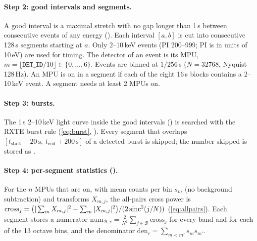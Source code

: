 \paragraph{Step 2: good intervals and segments.} A good interval is a maximal stretch with no gap longer than 1\,s between
consecutive events of any energy (). Each interval $[a,b]$ is cut into consecutive 128\,s
segments starting at $a$. Only 2--10\,keV events (PI 200--999; PI is in units of 10\,eV) are used for timing. The detector
of an event is its MPU, $m=\lfloor\mathtt{DET\_ID}/10\rfloor\in\{0,\dots,6\}$. Events are binned at $1/256$\,s ($N=32768$,
Nyquist 128\,Hz). An MPU is on in a segment if each of the eight 16\,s blocks contains a 2--10\,keV event. A segment needs at
least 2 MPUs on.

\paragraph{Step 3: bursts.} The 1\,s 2--10\,keV light curve inside the good intervals () is searched with
the RXTE burst rule (\cref{eq:burst}, ). Every segment that overlaps
$[t_\mathrm{start}-20\,\mathrm{s},\ t_\mathrm{end}+200\,\mathrm{s}]$ of a detected burst is skipped; the number skipped is
stored as .

\paragraph{Step 4: per-segment statistics ().} For the $n$ MPUs that are on, with mean counts per
bin $s_m$ (no background subtraction) and transforms $X_{m,j}$, the all-pairs cross power is
$\mathrm{cross}_j=\bigl(|\sum_mX_{m,j}|^2-\sum_m|X_{m,j}|^2\bigr)/(2\operatorname{sinc}^2(j/N))$ (\cref{eq:allpairs}). Each segment
stores a numerator $\mathrm{num}_{\mathcal B,r}=\frac{2}{N^2}\sum_{j\in\mathcal B}\mathrm{cross}_j$ for every band and for each
of the 13 octave bins, and the denominator $\mathrm{den}_r=\sum_{m<m'}s_ms_{m'}$.

